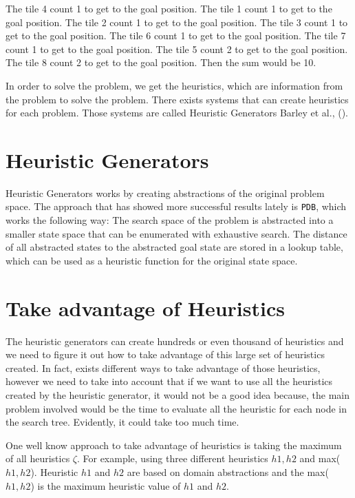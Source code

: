 The tile 4 count 1 to get to the goal position.
The tile 1 count 1 to get to the goal position.
The tile 2 count 1 to get to the goal position.
The tile 3 count 1 to get to the goal position.
The tile 6 count 1 to get to the goal position.
The tile 7 count 1 to get to the goal position.
The tile 5 count 2 to get to the goal position.
The tile 8 count 2 to get to the goal position.
Then the sum would be 10.

In order to solve the problem, we get the heuristics, which are information from the problem to solve the problem. There exists systems that can create heuristics for each problem. Those systems are called Heuristic Generators Barley et al., (\citeyear{BarleySantiagoOver}).

\section{Heuristic Generators}
Heuristic Generators works by creating abstractions of the original problem space. The approach that has showed more successful results lately is \texttt{PDB}, which works the following way: The search space of the problem is abstracted into a smaller state space that can be enumerated with exhaustive search. The distance of all abstracted states to the abstracted goal state are stored in a lookup table, which can be used as a heuristic function for the original state space.\\

\section{Take advantage of Heuristics}
The heuristic generators can create hundreds or even thousand of heuristics and we need to figure it out how to take advantage of this large set of heuristics created. In fact, exists different ways to take advantage of those heuristics, however we need to take into account that if we want to use all the heuristics created by the heuristic generator, it would not be a good idea because, the main problem involved would be the time to evaluate all the heuristic for each node in the search tree. Evidently, it could take too much time.

One well know approach to take advantage of heuristics is taking the maximum of all heuristics $\zeta$. For example, using three different heuristics $h1, h2$ and max($h1, h2$). Heuristic $h1$ and $h2$ are based on domain abstractions and the max($h1, h2$) is the maximum heuristic value of $h1$ and $h2$.

